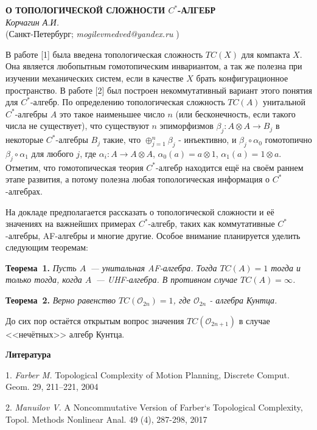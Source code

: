 \begin{center}{ \bf  О ТОПОЛОГИЧЕСКОЙ СЛОЖНОСТИ $C^*$-АЛГЕБР}\\
{\it Корчагин А.И. } \\
(Санкт-Петербург; {\it mogilevmedved@yandex.ru} )
\end{center}


В работе [1] была введена топологическая сложность $TC(X)$ для компакта $X$. Она является любопытным гомотопическим инвариантом, а так же полезна при изучении механических систем, если в качестве $X$ брать конфигурационное пространство. В работе [2] был построен некоммутативный вариант этого понятия для $C^*$-алгебр. По определению топологическая сложность $TC(A)$ унитальной $C^*$-алгебры $A$ это такое наименьшее число $n$ (или бесконечность, если такого числа не существует), что существуют $n$ эпиморфизмов $\beta_j:A\otimes A\to B_j$ в некоторые $C^*$-алгебры $B_j$ такие, что $\oplus_{j=1}^n\beta_j$ - инъективно, и $\beta_j\circ\alpha_0$ гомотопично $\beta_j\circ\alpha_1$ для любого $j$, где $\alpha_i:A\to A\otimes A$, $\alpha_0(a)=a\otimes1$, $\alpha_1(a)=1\otimes a$. Отметим, что гомотопическая теория $C^*$-алгебр находится ещё на своём раннем этапе развития, а потому полезна любая топологическая информация о $C^*$-алгебрах.

На докладе предполагается рассказать о топологической сло\-жности и её значениях на важнейших примерах $C^*$-алгебр, таких как коммутативные $C^*$-алгебры, AF-алгебры и многие другие. Особое внимание планируется уделить следующим теоремам:

\textbf{Теорема~1.} {\it Пусть $A$~--- унитальная AF-алгебра.
Тогда
\linebreak
${TC(A)=1}$ тогда и только тогда, когда $A$~--- UHF-алгебра. В противном случае $TC(A)=\infty$.}

\textbf{Теорема~2.} {\it Верно равенство $TC(\mathcal{O}_{2n})=1$, где $\mathcal{O}_{2n}$ - алгебра Кунтца.}

До сих пор остаётся открытым вопрос значения $TC(\mathcal{O}_{2n+1})$ в случае <<нечётных>> алгебр Кунтца.

\smallskip \centerline{\bf Литература}\nopagebreak

1. {\it Farber M.} Topological Complexity of Motion Planning, Dis\-c\-re\-te Comput. Geom. 29, 211–221, 2004

2. {\it Manuilov V.} A Noncommutative Version of Farber`s Topo\-lo\-gi\-cal Complexity, Topol. Methods Nonlinear
Anal. 49 (4), 287-298, 2017
